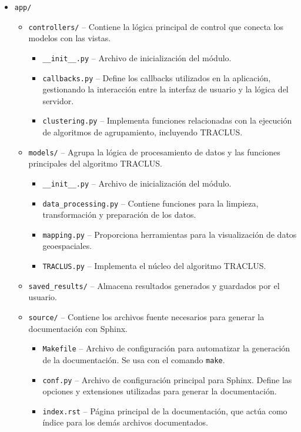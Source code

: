 \begin{itemize}
	\item \texttt{app/}
	\begin{itemize}
		\item \texttt{controllers/} -- Contiene la lógica principal de control que conecta los modelos con las vistas.
        	\begin{itemize}
        		\item \texttt{\_\_init\_\_.py} -- Archivo de inicialización del módulo.
        		\item \texttt{callbacks.py} -- Define los callbacks utilizados en la aplicación, gestionando la interacción entre la interfaz de usuario y la lógica del servidor.
        		\item \texttt{clustering.py} -- Implementa funciones relacionadas con la ejecución de algoritmos de agrupamiento, incluyendo TRACLUS.
 		\end{itemize}
        	\item \texttt{models/} -- Agrupa la lógica de procesamiento de datos y las funciones principales del algoritmo TRACLUS.
         \begin{itemize}
         	\item \texttt{\_\_init\_\_.py} -- Archivo de inicialización del módulo.
         	\item \texttt{data\_processing.py} -- Contiene funciones para la limpieza, transformación y preparación de los datos.
         	\item \texttt{mapping.py} -- Proporciona herramientas para la visualización de datos geoespaciales.
         	\item \texttt{TRACLUS.py} -- Implementa el núcleo del algoritmo TRACLUS.
		\end{itemize}
        	\item \texttt{saved\_results/} -- Almacena resultados generados y guardados por el usuario.
		\item \texttt{source/} -- Contiene los archivos fuente necesarios para generar la documentación con Sphinx.
		\begin{itemize}
    			\item \texttt{Makefile} -- Archivo de configuración para automatizar la generación de la documentación. Se usa con el comando \texttt{make}.
   			\item \texttt{conf.py} -- Archivo de configuración principal para Sphinx. Define las opciones y extensiones utilizadas para generar la documentación.
    			\item \texttt{index.rst} -- Página principal de la documentación, que actúa como índice para los demás archivos documentados.

\end{itemize}
\end{itemize}
\end{itemize}
